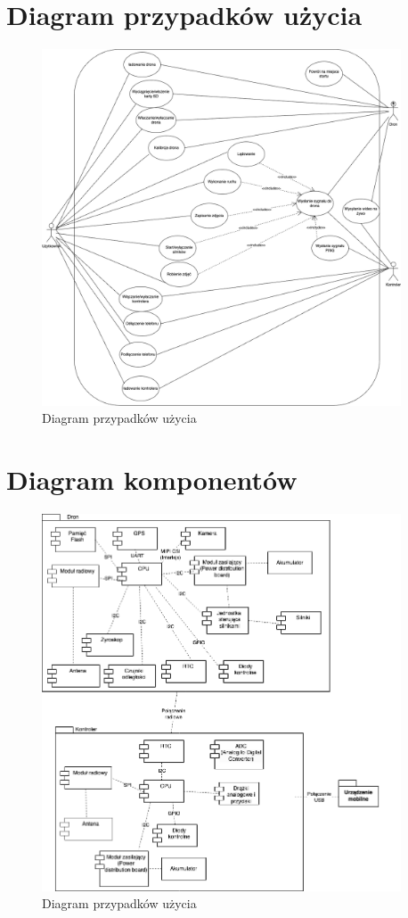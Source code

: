 \documentclass[12pt]{article}
\begin{document}
\section{Diagram przypadków użycia}
\begin{figure}[h]
    \centering
    \includegraphics[width=0.95\textwidth]{../resources/diagramWbudowane.drawio.png}
    \caption{Diagram przypadków użycia}
    \label{fig:example}
\end{figure}

\newpage
\section{Diagram komponentów}
\begin{figure}[h]
    \centering
    \includegraphics[width=0.95\textwidth]{../resources/diagram_komponentow.png}
    \caption{Diagram przypadków użycia}
    \label{fig:example}
\end{figure}
\end{document}
